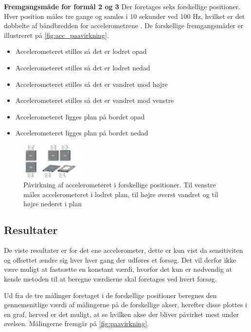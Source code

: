 \textbf{Fremgangsmåde for formål 2 og 3}\label{sec:acc_fremgangsmaade}
Der foretages seks forskellige positioner. Hver position måles tre gange og samles i 10 sekunder ved 100 Hz, hvilket er det dobbelte af båndbredden for accelerometrene \citep{analogdevices2010}. De forskellige fremgangsmåder er illustreret på \autoref{fig:acc_paavirkning}. 
\begin{itemize}
\item Accelerometeret stilles så det er lodret opad
\item Accelerometeret stilles så det er lodret nedad
\item Accelerometeret stilles så det er vandret mod højre
\item Accelerometeret stilles så det er vandret mod venstre
\item Accelerometeret ligges plan på bordet opad
\item Accelerometeret ligges plan på bordet nedad
\end{itemize}

\begin{figure}[H]
\centering
\includegraphics[width=0.3\textwidth]{figures/acc_paavirkning}
\caption{Påvirkning af accelerometeret i forskellige positioner. Til venstre måles accelerometeret i lodret plan, til højre øverst vandret og til højre nederst i plan \citep{analogdevices2010}}
\label{fig:acc_paavirkning}
\end{figure}

\subsection{Resultater} 
De viste resultater er for det ene accelerometer, dette er kun vist da sensitiviten og offsettet ændre sig hver hver gang der udføres et forsøg. Det vil derfor ikke være muligt at fastsætte en konstant værdi, hvorfor det kun er nødvendig at kende metoden til at beregne værdierne skal foretages ved hvert forsøg.

Ud fra de tre målinger foretaget i de forskellige positioner beregnes den gennemsnitlige værdi af målingerne på de forskellige akser, herefter disse plottes i en graf, herved er det muligt, at se hvilken akse der bliver påvirket mest under øvelsen. Målingerne fremgår på \autoref{fig:paavirkning}. 

